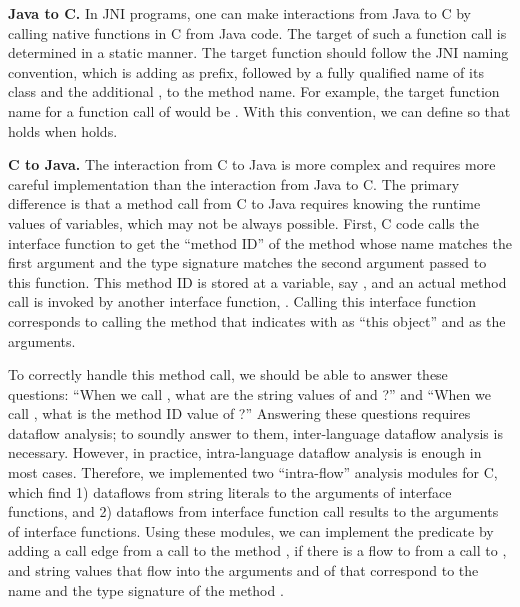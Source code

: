 \textbf{Java to C.} In JNI programs, one can make interactions from
Java to C by calling native functions in C from Java code. The target
of such a function call is determined in a static manner.
The target function should follow the JNI naming convention, which is adding
 as prefix, 
followed by a fully qualified name of its class and the additional \codeql{\_}, to the method name.
For example, the target function name for a function call of
 would be .
With this convention, we can define 
so that  holds when
 holds.


\medskip
\textbf{C to Java.} The interaction from C to Java is more complex and
requires more careful implementation than the interaction from Java to C.
The primary difference is that a method call from C to Java requires knowing
the runtime values of variables, which may not be always possible.
First, C code calls the interface function 
to get the ``method ID'' of the method whose name matches the first argument
and the type signature matches the second argument passed to this function.
This method ID is stored at a variable, say , and
an actual method call is invoked by another
interface function, . Calling this interface 
function corresponds to calling the method that  indicates
with  as ``this object'' and  as the arguments.

To correctly handle this method call, we should be able to answer these
questions: ``When we call ,
what are the string values of  and ?'' and
``When we call , what is the method ID value of ?''
Answering these questions requires dataflow analysis;
to soundly answer to them, inter-language dataflow analysis is necessary.
However, in practice, intra-language dataflow analysis is enough in most cases.
Therefore, we implemented two ``intra-flow'' analysis modules for C,
which find 1) dataflows from string literals to the arguments of interface functions,
and 2) dataflows from interface function call results to the arguments of interface functions.
Using these modules, we can implement the
predicate  by adding a call edge from a 
call to the method , if there is a flow to  from a
call to , and string values that flow into the
arguments  and  of  that
correspond to the name and the type signature of the method .

